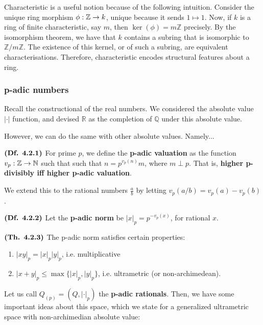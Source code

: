 \documentclass{article}
\begin{document}
Characteristic is a useful notion because of the following intuition. Consider the unique ring morphism $\phi: \mathbb{Z} \rightarrow k$, unique because it sends $1 \mapsto 1$. Now, if $k$ is a ring of finite characteristic, say $m$, then $\ker(\phi) = m\mathbb{Z}$ precisely. By the isomorphism theorem, we have that $k$ contains a subring that is isomorphic to $\mathbb{Z}/m\mathbb{Z}$. The existence of this kernel, or of such a subring, are equivalent characterisations. Therefore, characteristic encodes structural features about a ring.

\subsubsection*{p-adic numbers}
Recall the constructional of the real numbers. We considered the absolute value $|\cdot|$ function, and devised $\mathbb{R}$ as the completion of $\mathbb{Q}$ under this absolute value.

However, we can do the same with other absolute values. Namely...

$\textbf{(Df. 4.2.1)}$ For prime $p$, we define the \textbf{p-adic valuation} as the function $v_p: \mathbb{Z} \rightarrow \mathbb{N}$ such that such that $n = p^{v_p(n)}m$, where $m \perp p$. That is, \textbf{higher p-divisibly iff higher p-adic valuation}.

We extend this to the rational numbers $\frac{a}{b}$ by letting $v_p(a/b) = v_p(a)-v_p(b)$.

$\textbf{(Df. 4.2.2)}$ Let the \textbf{p-adic norm} be $|x|_p = p^{-v_p(x)}$, for rational $x$.

$\textbf{(Th. 4.2.3)}$ The p-adic norm satisfies certain properties:
\begin{enumerate}
    \item $|xy|_p = |x|_p|y|_p$, i.e. multiplicative
    \item $|x+y|_p \leq \max\{ |x|_p, |y|_p\}$, i.e. ultrametric (or non-archimedean).
\end{enumerate}

Let us call $Q_{(p)} = (Q,|\cdot|_p)$ the \textbf{p-adic rationals}.  Then, we have some important ideas about this space, which we state for a generalized ultrametric space with non-archimedian absolute value:
\end{document}
